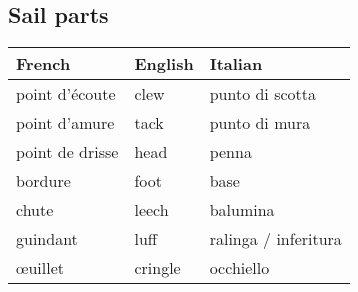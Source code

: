 \documentclass[a4paper, 12pt, twoside]{article}
\begin{document}
    \begin{indt}{\section{Sail parts}} %
        \begin{tabular}{|l|l|l|}
            \hline %
            \textbf{French}
            & \textbf{English}
            & \textbf{Italian}
            \\
            \hline
            \hline %
            point d'écoute %
            & clew
            & punto di scotta
            \\
            \hline %
            point d'amure %
            & tack
            & punto di mura
            \\
            \hline %
            point de drisse %
            & head
            & penna
            \\
            \hline %
            bordure %
            & foot
            & base
            \\
            \hline %
            chute %
            & leech
            & balumina
            \\
            \hline %
            guindant %
            & luff
            & ralinga / inferitura
            \\
            \hline %
            \oe uillet %
            & cringle
            & occhiello
            \\
            \hline %
        \end{tabular}
    \end{indt} %
\end{document}
